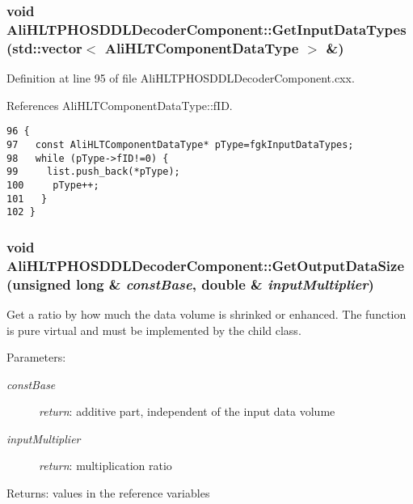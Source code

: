 \subsubsection{\setlength{\rightskip}{0pt plus 5cm}void Ali\-HLTPHOSDDLDecoder\-Component::Get\-Input\-Data\-Types (std::vector$<$ {\bf Ali\-HLTComponent\-Data\-Type} $>$ \&)\hspace{0.3cm}{\tt  [virtual]}}\label{classAliHLTPHOSDDLDecoderComponent_a11}




Definition at line 95 of file Ali\-HLTPHOSDDLDecoder\-Component.cxx.

References Ali\-HLTComponent\-Data\-Type::f\-ID.

\footnotesize\begin{verbatim}96 {
97   const AliHLTComponentDataType* pType=fgkInputDataTypes;
98   while (pType->fID!=0) {
99     list.push_back(*pType);
100     pType++;
101   }
102 }
\end{verbatim}\normalsize 


\subsubsection{\setlength{\rightskip}{0pt plus 5cm}void Ali\-HLTPHOSDDLDecoder\-Component::Get\-Output\-Data\-Size (unsigned long \& {\em const\-Base}, double \& {\em input\-Multiplier})\hspace{0.3cm}{\tt  [virtual]}}\label{classAliHLTPHOSDDLDecoderComponent_a13}


Get a ratio by how much the data volume is shrinked or enhanced. The function is pure virtual and must be implemented by the child class. \begin{Desc}
\item[Parameters:]
\begin{description}
\item[{\em const\-Base}]{\em return\/}: additive part, independent of the input data volume \item[{\em input\-Multiplier}]{\em return\/}: multiplication ratio \end{description}
\end{Desc}
\begin{Desc}
\item[Returns:]values in the reference variables \end{Desc}



